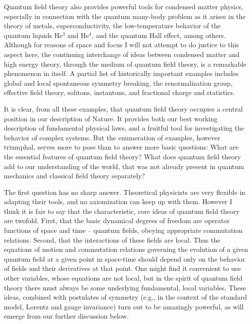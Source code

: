 \documentclass[aps,epsf]{revtex4}
\begin{document}
Quantum field theory also provides powerful tools for condensed matter
physics, especially in connection with the quantum many-body problem
as it arises in the theory of metals, superconductivity, the
low-temperature behavior of the quantum liquids He$^3$ and He$^4$, and
the quantum Hall effect, among others.  Although for reasons of space
and focus I will not attempt to do justice to this aspect here, the
continuing interchange of ideas between condensed matter and high
energy theory, through the medium of quantum field theory, is a
remarkable phenomenon in itself.  A partial list of historically
important examples includes global and local spontaneous symmetry
breaking, the renormalization group, effective field theory, solitons,
instantons, and fractional charge and statistics. 

It is clear, from all
these examples, that quantum field theory occupies a central position
in our description of Nature.  It provides both our best working
description of fundamental physical laws, and a fruitful tool for
investigating the behavior of complex systems.  But the enumeration of
examples, however triumphal, serves more to pose than to answer more
basic questions: What are the essential features of quantum field
theory?  What does quantum field theory add to our understanding of
the world, that was not already present in quantum mechanics and
classical field theory separately?  

The first question has no sharp
answer.  Theoretical physicists are very flexible in adapting their
tools, and no axiomization can keep up with them.  However I think it
is fair to say that the characteristic, core ideas of quantum field
theory are twofold.  First, that the basic dynamical degrees of
freedom are operator functions of space and time -- quantum fields,
obeying appropriate commutation relations.  Second, that the
interactions of these fields are local.  Thus the equations of motion
and commutation relations governing the evolution of a given quantum
field at a given point in space-time should depend only on the
behavior of fields and their derivatives at that point.  One might
find it convenient to use other variables, whose equations are not
local, but in the spirit of quantum field theory there must always be
some underlying fundamental, local variables.  These ideas, combined
with postulates of symmetry (e.g., in the context of the standard
model, Lorentz and gauge invariance) turn out to be amazingly
powerful, as will emerge from our further discussion below.  
\end{document}
